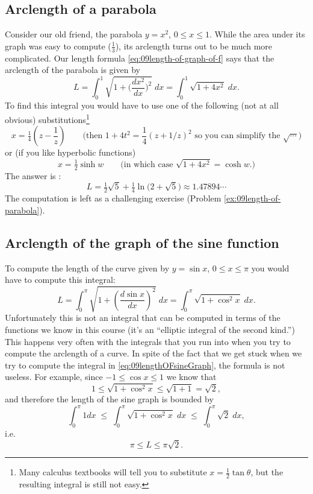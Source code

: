 \subsection{Arclength of a parabola} %
Consider our old friend, the parabola $y=x^2$, $0\leq x\leq 1$.  While the area
under its graph was easy to compute ($\frac13$), its arclength turns out to be much
more complicated.
%
Our length formula \eqref{eq:09length-of-graph-of-f} says that the arclength of the
parabola is given by
\begin{equation}
  L = \int_0^1 \sqrt{1+\bigl(\frac{dx^2}{dx}\bigr)^2}\;dx =\int_0^1
  \sqrt{1+4x^2}\;dx.
  \label{eq:09length-of-parabola}
\end{equation}
To find this integral you would have to use one of the following (not at all
obvious) substitutions\footnote{Many calculus textbooks will tell you to
substitute $x = \frac12\tan\theta$, but the resulting integral is still not
easy. }
\begin{equation}
  x=\tfrac14\left(z-\frac1z\right)\qquad
  \text{(then $1+4t^2 =\frac14(z+1/z)^2 $ so
  you can simplify the $\sqrt{\cdots}$)}
  \label{eq:09rationalizing-substitution}
\end{equation}
or (if you like hyperbolic functions)
\[
  x = \tfrac12\sinh w\qquad \text{(in which case $\sqrt{1+4x^2} = \cosh w$.)}
\]
The answer is :
\[
  L = \tfrac12 \sqrt{5} + \tfrac 14 \ln\bigl(2+\sqrt{5}\bigr) \approx 1.47894\cdots
\]
The computation is left as a challenging exercise (Problem
\ref{ex:09length-of-parabola}).

\subsection{Arclength of the graph of the sine function} %
To compute the length of the curve given by $y=\sin x$, $0\leq x\leq \pi$ you
would have to compute this integral:
\begin{equation}\label{eq:09lengthOFsineGraph}
  L
  = \int_0^\pi \sqrt{1+\left(\frac{d\sin x}{dx}\right)^2}\; dx
  = \int_0^\pi \sqrt{1+\cos^2 x}\; dx.
\end{equation}%
\marginpar{}%
Unfortunately this is not an integral that can be computed in terms of the
functions we know in this course (it's an ``elliptic integral of the second
kind.'')  This happens very often with the integrals that you run into when you
try to compute the arclength of a curve.  In spite of the fact that we get stuck
when we try to compute the integral in \eqref{eq:09lengthOFsineGraph}, the
formula is not useless.  For example, since $-1\leq \cos x\leq 1$ we know that
\[
  1\leq \sqrt{1+\cos ^2 x} \leq \sqrt{1+1} = \sqrt2,
\]
and therefore the length of the sine graph is bounded by
\[
  \int_0^\pi 1dx \;\leq\; \int_0^\pi \sqrt{1+\cos^2 x}\; dx \;\leq\;
  \int_0^\pi\sqrt2\;dx,
\]
i.e.
\[
  \pi \leq L \leq \pi\sqrt2.
\]

